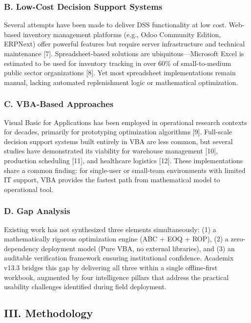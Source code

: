 ﻿\documentclass[conference]{IEEEtran}
\begin{document}
\subsubsection{B. Low-Cost Decision Support
Systems}\label{b.-low-cost-decision-support-systems}

Several attempts have been made to deliver DSS functionality at low
cost. Web-based inventory management platforms (e.g., Odoo Community
Edition, ERPNext) offer powerful features but require server
infrastructure and technical maintenance {[}7{]}. Spreadsheet-based
solutions are ubiquitous---Microsoft Excel is estimated to be used for
inventory tracking in over 60\% of small-to-medium public sector
organizations {[}8{]}. Yet most spreadsheet implementations remain
manual, lacking automated replenishment logic or mathematical
optimization.

\subsubsection{C. VBA-Based Approaches}\label{c.-vba-based-approaches}

Visual Basic for Applications has been employed in operational research
contexts for decades, primarily for prototyping optimization algorithms
{[}9{]}. Full-scale decision support systems built entirely in VBA are
less common, but several studies have demonstrated its viability for
warehouse management {[}10{]}, production scheduling {[}11{]}, and
healthcare logistics {[}12{]}. These implementations share a common
finding: for single-user or small-team environments with limited IT
support, VBA provides the fastest path from mathematical model to
operational tool.

\subsubsection{D. Gap Analysis}\label{d.-gap-analysis}

Existing work has not synthesized three elements simultaneously: (1) a
mathematically rigorous optimization engine (ABC + EOQ + ROP), (2) a
zero-dependency deployment model (Pure VBA, no external libraries), and
(3) an auditable verification framework ensuring institutional
confidence. Academix v13.3 bridges this gap by delivering all three
within a single offline-first workbook, augmented by four intelligence
pillars that address the practical usability challenges identified
during field deployment.

\subsection{III. Methodology}\label{iii.-methodology}
\end{document}

